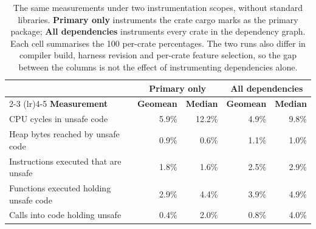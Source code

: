 \begin{table}[tb]
\caption{The same measurements under two instrumentation scopes,
without standard libraries. \textbf{Primary only} instruments the
crate cargo marks as the primary package; \textbf{All dependencies}
instruments every crate in the dependency graph. Each cell summarises
the 100 per-crate percentages. The two runs also differ in compiler
build, harness revision and per-crate feature selection, so the gap
between the columns is not the effect of instrumenting dependencies
alone.}
\label{table:scope_comparison}
\centering
{\sffamily
\begin{tabular}{@{}l|rr|rr@{}}
\toprule
& \multicolumn{2}{c|}{\textbf{Primary only}} & \multicolumn{2}{c}{\textbf{All dependencies}} \\
\cmidrule(lr){2-3} \cmidrule(lr){4-5}
\textbf{Measurement} & \textbf{Geomean} & \textbf{Median} & \textbf{Geomean} & \textbf{Median} \\
\midrule
CPU cycles in unsafe code & 5.9\% & 12.2\% & 4.9\% & 9.8\% \\
Heap bytes reached by unsafe code & 0.9\% & 0.6\% & 1.1\% & 1.0\% \\
Instructions executed that are unsafe & 1.8\% & 1.6\% & 2.5\% & 2.9\% \\
Functions executed holding unsafe code & 2.9\% & 4.4\% & 3.9\% & 4.9\% \\
Calls into code holding unsafe & 0.4\% & 2.0\% & 0.8\% & 4.0\% \\
\bottomrule
\end{tabular}
}
\end{table}
